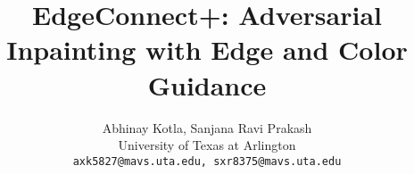 \documentclass[10pt,twocolumn,letterpaper]{article}
\title{EdgeConnect+: Adversarial Inpainting with Edge and Color Guidance}
\author{
Abhinay Kotla, Sanjana Ravi Prakash\\
University of Texas at Arlington\\
{\tt\small axk5827@mavs.uta.edu, sxr8375@mavs.uta.edu}
}
\begin{document}
\maketitle










{\small


}
\end{document}
